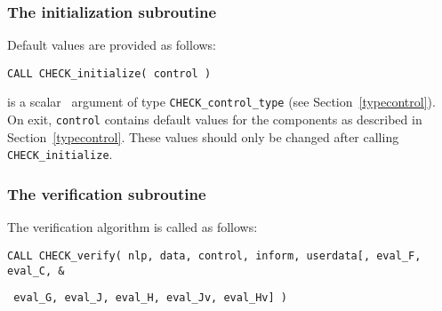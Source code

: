 \documentclass{galahad}
\newcommand{\packagename}{CHECK}
\begin{document}

\subsubsection{The initialization subroutine}\label{subinit}
 Default values are provided as follows:
\vspace*{1mm}

\hspace{8mm}
{\tt CALL \packagename\_initialize( control )}

\vspace*{-3mm}
\begin{description}

 is a scalar \intentout\ argument of type 
{\tt \packagename\_control\_type}
(see Section~\ref{typecontrol}). 
On exit, {\tt control} contains default values for the components as
described in Section~\ref{typecontrol}.
These values should only be changed after calling 
{\tt \packagename\_initialize}.

\end{description}


\subsubsection{The verification  subroutine}
The verification algorithm is called as follows:
\vspace*{1mm}

\hspace{8mm}
{\tt CALL \packagename\_verify( nlp, data, control, inform, userdata[, eval\_F, 
eval\_C, \hspace{4mm}                  \&}
\vspace*{-1mm}

\hspace{41.5mm}
{\tt                        
eval\_G, eval\_J, eval\_H, eval\_Jv, eval\_Hv] )}
\end{document}
